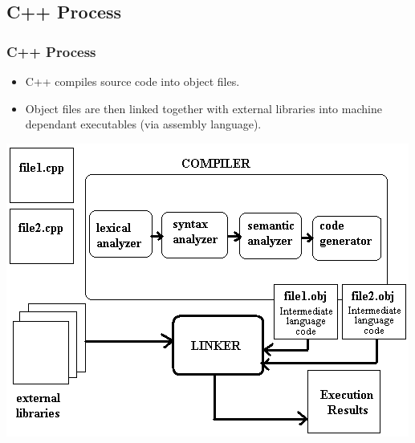 \documentclass{beamer}
\begin{document}
\subsection{C++ Process}
\begin{frame}
\frametitle{C++ Process}
\begin{itemize}
\item C++ compiles source code into {\color{red}object files}.
\item Object files are then {\color{green}linked} together with {\color{purple} external libraries} into {\color{orange} machine dependant executables} (via assembly language).
\end{itemize}
\includegraphics[scale=0.5]{compile.png}
\end{frame}
\end{document}
